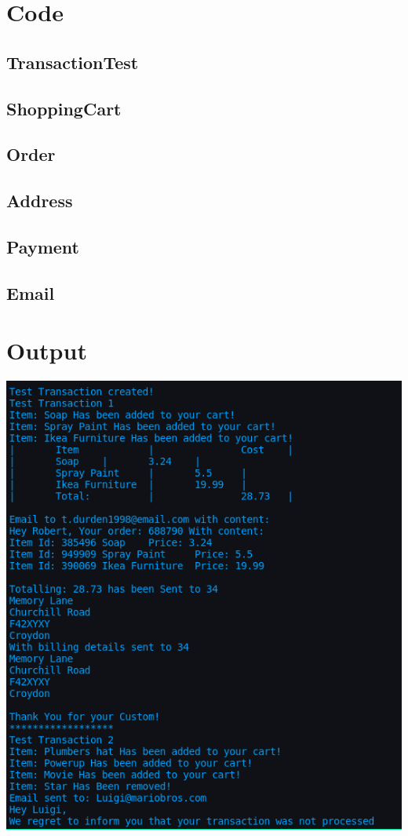 \documentclass{article}
\begin{document}
	\section{Code}
	\subsection{TransactionTest}
	\subsection{ShoppingCart}
	\subsection{Order}
	\subsection{Address}
	\subsection{Payment}
	\newpage
	\subsection{Email}
	\section{Output}
	\includegraphics{output.png}
\end{document}
